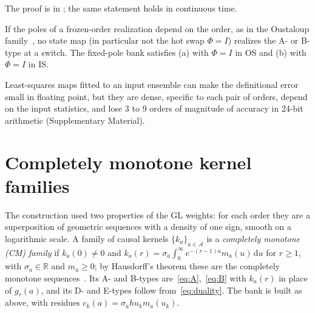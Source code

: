 The proof is in ; the same statement holds in continuous time.

\begin{corollary}\label{cor:moving}
If the poles of a frozen-order realization depend on the order, as in the Oustaloup family~\cite{oustaloup2000}, no state map (in particular not the hot swap $\Phi=I$) realizes the A- or B-type at a switch. The fixed-pole bank satisfies (a) with $\Phi=I$ in OS and (b) with $\Phi=I$ in IS.
\end{corollary}

Least-squares maps fitted to an input ensemble can make the definitional error small in floating point, but they are dense, specific to each pair of orders, depend on the input statistics, and lose 3 to 9 orders of magnitude of accuracy in 24-bit arithmetic (Supplementary Material).

\section{Completely monotone kernel families}\label{sec:cm}

The construction used two properties of the GL weights: for each order they are a superposition of geometric sequences with a density of one sign, smooth on a logarithmic scale. A family of causal kernels $\{k_a\}_{a\in\mathcal A}$ is a \emph{completely monotone (CM) family} if $k_a(0)\neq0$ and $k_a(r)=\sigma_a\int_0^\infty e^{-(r-1)u}m_a(u)\,\mathrm du$ for $r\ge1$, with $\sigma_a\in\mathbb R$ and $m_a\ge0$; by Hausdorff's theorem these are the completely monotone sequences~\cite{widder1941}. Its A- and B-types are~\eqref{eq:A},~\eqref{eq:B} with $k_a(r)$ in place of $g_r(a)$, and its D- and E-types follow from~\eqref{eq:duality}. The bank is built as above, with residues $c_k(a)=\sigma_ahu_km_a(u_k)$.

